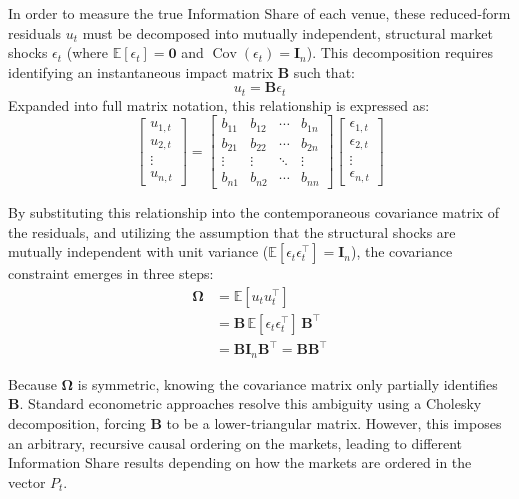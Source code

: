 \documentclass[12pt,a4paper,twoside,openany]{book}
\begin{document}
In order to measure the true Information Share of each venue, these reduced-form residuals $u_t$ must be decomposed into mutually independent, 
structural market shocks $\epsilon_t$ (where $\mathbb{E}[\epsilon_t] = \mathbf{0}$ and $\operatorname{Cov}(\epsilon_t) = \mathbf{I}_n$). 
This decomposition requires identifying an instantaneous impact matrix $\mathbf{B}$ such that:
\begin{equation}
    u_t = \mathbf{B} \epsilon_t
\end{equation}
Expanded into full matrix notation, this relationship is expressed as:
\begin{equation}
    \begin{bmatrix}
    u_{1,t} \\
    u_{2,t} \\
    \vdots \\
    u_{n,t}
    \end{bmatrix}
    =
    \begin{bmatrix}
    b_{11} & b_{12} & \cdots & b_{1n} \\
    b_{21} & b_{22} & \cdots & b_{2n} \\
    \vdots & \vdots & \ddots & \vdots \\
    b_{n1} & b_{n2} & \cdots & b_{nn}
    \end{bmatrix}
    \begin{bmatrix}
    \epsilon_{1,t} \\
    \epsilon_{2,t} \\
    \vdots \\
    \epsilon_{n,t}
    \end{bmatrix}
\end{equation}

By substituting this relationship into the contemporaneous covariance matrix of the residuals, and utilizing the assumption that 
the structural shocks are mutually independent with unit variance ($\mathbb{E}[\epsilon_t \epsilon_t^\top] = \mathbf{I}_n$), the covariance constraint emerges in three steps:
\begin{align}
    \boldsymbol{\Omega} &= \mathbb{E}[u_t u_t^\top] \nonumber \\
    &= \mathbf{B} \, \mathbb{E}[\epsilon_t \epsilon_t^\top] \, \mathbf{B}^\top \\
    &= \mathbf{B} \mathbf{I}_n \mathbf{B}^\top = \mathbf{B}\mathbf{B}^\top \nonumber
\end{align}

Because $\boldsymbol{\Omega}$ is symmetric, knowing the covariance matrix only partially identifies $\mathbf{B}$. 
Standard econometric approaches resolve this ambiguity using a Cholesky decomposition, forcing $\mathbf{B}$ to be a lower-triangular matrix. 
However, this imposes an arbitrary, recursive causal ordering on the markets, leading to different Information Share results 
depending on how the markets are ordered in the vector $P_t$.
\end{document}
